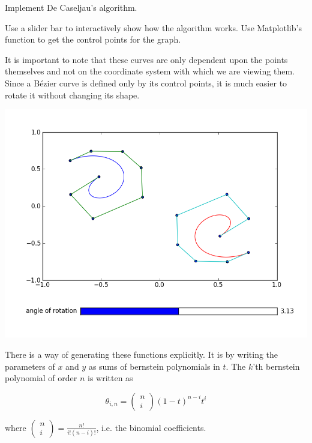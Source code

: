 \begin{problem}
Implement De Caseljau's algorithm.
\end{problem}

\begin{problem}
Use a slider bar to interactively show how the algorithm works. 
Use Matplotlib's  function to get the control points for the graph.
\end{problem}

It is important to note that these curves are only dependent upon the points themselves and not on the coordinate system with which we are viewing them. 
Since a B\'{e}zier curve is defined only by its control points, it is much easier to rotate it without changing its shape.

\includegraphics[width=\textwidth]{Bezier_rotation}

There is a way of generating these functions explicitly. 
It is by writing the parameters of $x$ and $y$ as sums of bernstein polynomials in $t$. 
The $k$'th bernstein polynomial of order $n$ is written as 

$$\theta_{i,n}=\left( \begin{smallmatrix} n\\ i \end{smallmatrix} \right) (1-t)^{n-i} t^i$$

where $\left( \begin{smallmatrix} n\\ i \end{smallmatrix} \right) = \frac{n!}{i!(n-i)!}$, i.e. the binomial coefficients.

